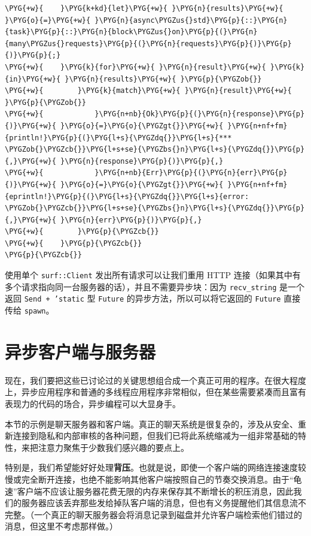 \begin{Verbatim}[commandchars=\\\{\},breaklines=true,breakanywhere=true,fontsize=\codefont,xleftmargin=17bp]
\PYG{+w}{    }\PYG{k+kd}{let}\PYG{+w}{ }\PYG{n}{results}\PYG{+w}{ }\PYG{o}{=}\PYG{+w}{ }\PYG{n}{async\PYGZus{}std}\PYG{p}{::}\PYG{n}{task}\PYG{p}{::}\PYG{n}{block\PYGZus{}on}\PYG{p}{(}\PYG{n}{many\PYGZus{}requests}\PYG{p}{(}\PYG{n}{requests}\PYG{p}{)}\PYG{p}{)}\PYG{p}{;}
\PYG{+w}{    }\PYG{k}{for}\PYG{+w}{ }\PYG{n}{result}\PYG{+w}{ }\PYG{k}{in}\PYG{+w}{ }\PYG{n}{results}\PYG{+w}{ }\PYG{p}{\PYGZob{}}
\PYG{+w}{        }\PYG{k}{match}\PYG{+w}{ }\PYG{n}{result}\PYG{+w}{ }\PYG{p}{\PYGZob{}}
\PYG{+w}{            }\PYG{n+nb}{Ok}\PYG{p}{(}\PYG{n}{response}\PYG{p}{)}\PYG{+w}{ }\PYG{o}{=}\PYG{o}{\PYGZgt{}}\PYG{+w}{ }\PYG{n+nf+fm}{println!}\PYG{p}{(}\PYG{l+s}{\PYGZdq{}}\PYG{l+s}{*** \PYGZob{}\PYGZcb{}}\PYG{l+s+se}{\PYGZbs{}n}\PYG{l+s}{\PYGZdq{}}\PYG{p}{,}\PYG{+w}{ }\PYG{n}{response}\PYG{p}{)}\PYG{p}{,}
\PYG{+w}{            }\PYG{n+nb}{Err}\PYG{p}{(}\PYG{n}{err}\PYG{p}{)}\PYG{+w}{ }\PYG{o}{=}\PYG{o}{\PYGZgt{}}\PYG{+w}{ }\PYG{n+nf+fm}{eprintln!}\PYG{p}{(}\PYG{l+s}{\PYGZdq{}}\PYG{l+s}{error: \PYGZob{}\PYGZcb{}}\PYG{l+s+se}{\PYGZbs{}n}\PYG{l+s}{\PYGZdq{}}\PYG{p}{,}\PYG{+w}{ }\PYG{n}{err}\PYG{p}{)}\PYG{p}{,}
\PYG{+w}{        }\PYG{p}{\PYGZcb{}}
\PYG{+w}{    }\PYG{p}{\PYGZcb{}}
\PYG{p}{\PYGZcb{}}
\end{Verbatim}

使用单个 \texttt{surf::Client} 发出所有请求可以让我们重用 HTTP 连接（如果其中有多个请求指向同一台服务器的话），并且不需要异步块：因为 \texttt{recv\_string} 是一个返回 \texttt{Send + 'static} 型 \texttt{Future} 的异步方法，所以可以将它返回的 \texttt{Future} 直接传给 \texttt{spawn}。

\section{异步客户端与服务器}

现在，我们要把这些已讨论过的关键思想组合成一个真正可用的程序。在很大程度上，异步应用程序和普通的多线程应用程序非常相似，但在某些需要紧凑而且富有表现力的代码的场合，异步编程可以大显身手。

本节的示例是聊天服务器和客户端。真正的聊天系统是很复杂的，涉及从安全、重新连接到隐私和内部审核的各种问题，但我们已将此系统缩减为一组非常基础的特性，来把注意力聚焦于少数我们感兴趣的要点上。

特别是，我们希望能好好处理\textbf{背压}。也就是说，即使一个客户端的网络连接速度较慢或完全断开连接，也绝不能影响其他客户端按照自己的节奏交换消息。由于“龟速”客户端不应该让服务器花费无限的内存来保存其不断增长的积压消息，因此我们的服务器应该丢弃那些发给掉队客户端的消息，但也有义务提醒他们其信息流不完整。（一个真正的聊天服务器会将消息记录到磁盘并允许客户端检索他们错过的消息，但这里不考虑那样做。）

